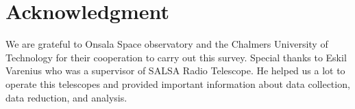 \documentclass[conference]{IEEEtran}
\begin{document}
\section*{Acknowledgment}

We are grateful to Onsala Space observatory and the Chalmers University of Technology for their cooperation to carry out this survey. Special thanks to Eskil Varenius who was a supervisor of SALSA Radio Telescope. He helped us a lot to operate this telescopes and provided important information about data collection, data reduction, and analysis.






\end{document}
